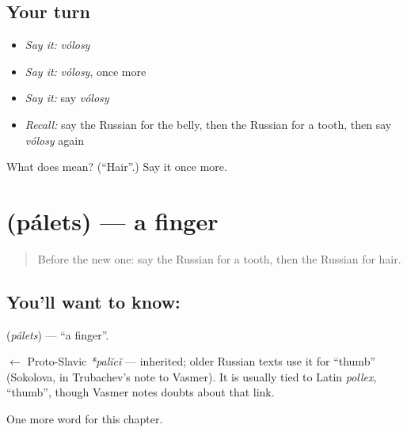 \subsection*{Your turn}
\begin{itemize}
\raggedright
  \item \emph{Say it:} \emph{vólosy}
  \item \emph{Say it:} \emph{vólosy}, once more
  \item \emph{Say it:} say \emph{vólosy}
  \item \emph{Recall:} say the Russian for the belly, then the Russian for a tooth, then say \emph{vólosy} again
\end{itemize}

\begin{tcolorbox}[breakable,colback=teal!4,colframe=teal!35!black,title={Before you move on}]
What does  mean? (\textquotedblleft{}Hair\textquotedblright{}.) Say it once more.
\end{tcolorbox}
\section[\texorpdfstring{\ru{палец} (pálets)}{палец (pálets)}]{ (pálets) — a finger}

\label{lesson:RU-C30-finger}



\begin{quote}
Before the new one: say the Russian for a tooth, then the Russian for hair.
\end{quote}

\subsection*{You'll want to know: }
\textbf{} (\emph{pálets}) — \textquotedblleft{}a finger\textquotedblright{}.

\begin{cousinweb}
\textbf{} $\leftarrow$ Proto-Slavic \emph{*palĭcĭ} — inherited; older Russian texts use it for \textquotedblleft{}thumb\textquotedblright{} (Sokolova, in Trubachev's note to Vasmer). It is usually tied to Latin \emph{pollex}, \textquotedblleft{}thumb\textquotedblright{}, though Vasmer notes doubts about that link.
\end{cousinweb}

\begin{grammarlens}[title={What you've built}]
One more word for this chapter.
\end{grammarlens}

